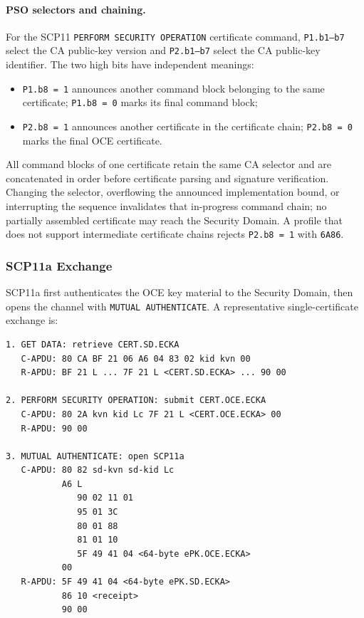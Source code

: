 \paragraph{PSO selectors and chaining.}
For the SCP11 \texttt{PERFORM SECURITY OPERATION} certificate command,
\texttt{P1.b1--b7} select the CA public-key version and \texttt{P2.b1--b7}
select the CA public-key identifier.  The two high bits have independent
meanings:
\begin{itemize}
\item \texttt{P1.b8 = 1} announces another command block belonging to the same
      certificate; \texttt{P1.b8 = 0} marks its final command block;
\item \texttt{P2.b8 = 1} announces another certificate in the certificate
      chain; \texttt{P2.b8 = 0} marks the final OCE certificate.
\end{itemize}
All command blocks of one certificate retain the same CA selector and are
concatenated in order before certificate parsing and signature verification.
Changing the selector, overflowing the announced implementation bound, or
interrupting the sequence invalidates that in-progress command chain; no
partially assembled certificate may reach the Security Domain.  A profile that
does not support intermediate certificate chains rejects
\texttt{P2.b8 = 1} with \texttt{6A86}.

\subsubsection{SCP11a Exchange}

SCP11a first authenticates the OCE key material to the Security Domain, then
opens the channel with \texttt{MUTUAL AUTHENTICATE}. A representative
single-certificate exchange is:

\begin{verbatim}
1. GET DATA: retrieve CERT.SD.ECKA
   C-APDU: 80 CA BF 21 06 A6 04 83 02 kid kvn 00
   R-APDU: BF 21 L ... 7F 21 L <CERT.SD.ECKA> ... 90 00

2. PERFORM SECURITY OPERATION: submit CERT.OCE.ECKA
   C-APDU: 80 2A kvn kid Lc 7F 21 L <CERT.OCE.ECKA> 00
   R-APDU: 90 00

3. MUTUAL AUTHENTICATE: open SCP11a
   C-APDU: 80 82 sd-kvn sd-kid Lc
           A6 L
              90 02 11 01
              95 01 3C
              80 01 88
              81 01 10
              5F 49 41 04 <64-byte ePK.OCE.ECKA>
           00
   R-APDU: 5F 49 41 04 <64-byte ePK.SD.ECKA>
           86 10 <receipt>
           90 00
\end{verbatim}

